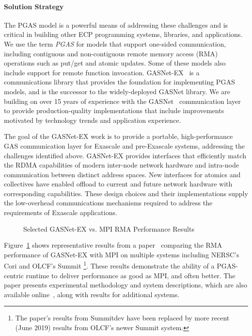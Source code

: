 \paragraph{Solution Strategy}

The PGAS model is a powerful means of addressing these
challenges and is critical in building other ECP programming systems,
libraries, and applications.  We use the term {\em PGAS} for models that support
one-sided communication, 
including contiguous and non-contiguous remote memory access (RMA) operations such as put/get
and atomic updates. Some of these models also include support for remote function invocation.
GASNet-EX~\cite{gasnet-lcpc18} is a communications library that provides the foundation for implementing
PGAS models, and is the successor to the widely-deployed GASNet library.
We are building on over 15 years of experience with the GASNet~\cite{gasnet-spec,gasnet-site}
communication layer to provide production-quality implementations that include
improvements motivated by
technology trends and application experience.  

The goal of the GASNet-EX work is to provide a portable, high-performance GAS
communication layer for Exascale and pre-Exascale systems, addressing the challenges
identified above.
GASNet-EX provides interfaces that efficiently match the RDMA capabilities of modern
inter-node network hardware and intra-node communication between distinct address spaces.
New interfaces for atomics and collectives have enabled offload to current
and future network hardware with corresponding capabilities.
These design choices and their implementations supply the low-overhead communications
mechanisms required to address the requirements of Exascale applications.

\begin{figure}[htb]
  \centering
  \caption{\label{fig:gasnet-ex-rma} Selected GASNet-EX vs. MPI RMA Performance Results}
\end{figure}

Figure~\ref{fig:gasnet-ex-rma} shows representative results from a
paper~\cite{gasnet-lcpc18} comparing
the RMA performance of GASNet-EX with MPI on multiple systems including
NERSC's Cori and OLCF's Summit%
\footnote{The paper's results from Summitdev
have been replaced by more recent (June 2019) results from OLCF's newer Summit system.}.
These results demonstrate the ability of a PGAS-centric runtime to
deliver performance as good as MPI, and often better.
%
The paper presents experimental methodology and system descriptions, which are
also available online~\cite{gasnet-site}, along with results for additional
systems.

